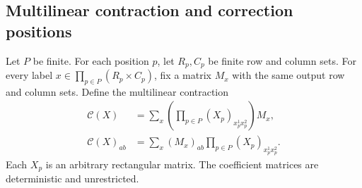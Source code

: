 \subsection{Multilinear contraction and correction positions}

\begin{definition}
    \label{def:construction_contraction}
    \leanok
    Let $P$ be finite. For each position $p$, let $R_p,C_p$ be finite
    row and column sets. For every label
    $x\in\prod_{p\in P}(R_p\times C_p)$, fix a matrix $M_x$ with the
    same output row and column sets. Define the multilinear contraction
    \begin{align}
        \mathcal C(X)      & =\sum_x
        \left(\prod_{p\in P}(X_p)_{x_p^1x_p^2}\right)M_x,
        \label{eq:construction_contraction}    \\
        \mathcal C(X)_{ab} & =\sum_x(M_x)_{ab}
        \prod_{p\in P}(X_p)_{x_p^1x_p^2}.
        \label{eq:construction_contraction_entry}
    \end{align}
    Each $X_p$ is an arbitrary rectangular matrix.
    The coefficient matrices are deterministic and unrestricted.
\end{definition}

